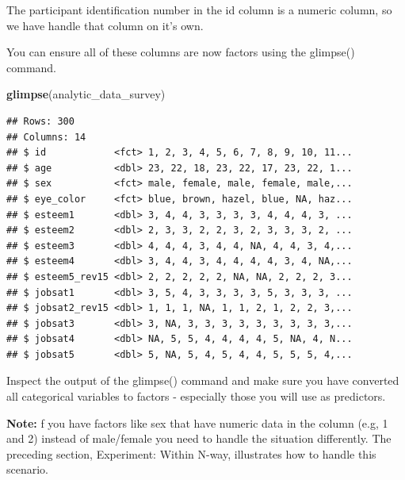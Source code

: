 \documentclass[
]{krantz}
\makeatletter
\newenvironment{Shaded}{\begin{snugshade}}{\end{snugshade}}
\newcommand{\DataTypeTok}[1]{\textcolor[rgb]{0.27,0.27,0.27}{#1}}
\newcommand{\KeywordTok}[1]{\textcolor[rgb]{0.27,0.27,0.27}{\textbf{#1}}}
\newcommand{\NormalTok}[1]{#1}
\newcommand{\OperatorTok}[1]{\textcolor[rgb]{0.43,0.43,0.43}{\textbf{#1}}}
\newcommand{\StringTok}[1]{\textcolor[rgb]{0.5,0.5,0.5}{#1}}
\newenvironment{kframe}{%
\medskip{}
\setlength{\fboxsep}{.8em}
 \def\at@end@of@kframe{}%
 \ifinner\ifhmode%
  \def\at@end@of@kframe{\end{minipage}}%
  \begin{minipage}{\columnwidth}%
 \fi\fi%
 \def\FrameCommand##1{\hskip\@totalleftmargin \hskip-\fboxsep
 \colorbox{shadecolor}{##1}\hskip-\fboxsep
     \hskip-\linewidth \hskip-\@totalleftmargin \hskip\columnwidth}%
 \MakeFramed {\advance\hsize-\width
   \@totalleftmargin\z@ \linewidth\hsize
   \@setminipage}}%
 {\par\unskip\endMakeFramed%
 \at@end@of@kframe}
\renewenvironment{Shaded}{\begin{kframe}}{\end{kframe}}
\makeatother
\begin{document}
The participant identification number in the id column is a numeric column, so we have handle that column on it's own.

\begin{Shaded}
\end{Shaded}

You can ensure all of these columns are now factors using the glimpse() command.

\begin{Shaded}
\begin{Highlighting}[]
\KeywordTok{glimpse}\NormalTok{(analytic_data_survey)}
\end{Highlighting}
\end{Shaded}

\begin{verbatim}
## Rows: 300
## Columns: 14
## $ id            <fct> 1, 2, 3, 4, 5, 6, 7, 8, 9, 10, 11...
## $ age           <dbl> 23, 22, 18, 23, 22, 17, 23, 22, 1...
## $ sex           <fct> male, female, male, female, male,...
## $ eye_color     <fct> blue, brown, hazel, blue, NA, haz...
## $ esteem1       <dbl> 3, 4, 4, 3, 3, 3, 3, 4, 4, 4, 3, ...
## $ esteem2       <dbl> 2, 3, 3, 2, 2, 3, 2, 3, 3, 3, 2, ...
## $ esteem3       <dbl> 4, 4, 4, 3, 4, 4, NA, 4, 4, 3, 4,...
## $ esteem4       <dbl> 3, 4, 4, 3, 4, 4, 4, 4, 3, 4, NA,...
## $ esteem5_rev15 <dbl> 2, 2, 2, 2, 2, NA, NA, 2, 2, 2, 3...
## $ jobsat1       <dbl> 3, 5, 4, 3, 3, 3, 3, 5, 3, 3, 3, ...
## $ jobsat2_rev15 <dbl> 1, 1, 1, NA, 1, 1, 2, 1, 2, 2, 3,...
## $ jobsat3       <dbl> 3, NA, 3, 3, 3, 3, 3, 3, 3, 3, 3,...
## $ jobsat4       <dbl> NA, 5, 5, 4, 4, 4, 4, 5, NA, 4, N...
## $ jobsat5       <dbl> 5, NA, 5, 4, 5, 4, 4, 5, 5, 5, 4,...
\end{verbatim}

Inspect the output of the glimpse() command and make sure you have converted all categorical variables to factors - especially those you will use as predictors.

\textbf{Note:} f you have factors like sex that have numeric data in the column (e.g, 1 and 2) instead of male/female you need to handle the situation differently. The preceding section, Experiment: Within N-way, illustrates how to handle this scenario.
\end{document}
